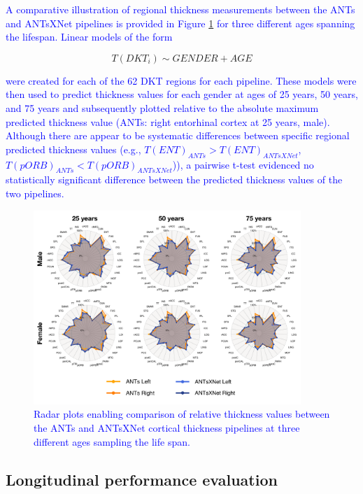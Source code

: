 \documentclass[12pt,]{article}
\begin{document}
\textcolor{blue}{
A comparative illustration of regional thickness measurements between the ANTs
and ANTsXNet pipelines is provided in Figure \ref{fig:radar} for three different
ages spanning the lifespan.  Linear models of the form}

\begin{equation}
  T(DKT_i) \sim GENDER + AGE
\end{equation}

\textcolor{blue}{
were created for each of the 62 DKT regions for each pipeline.  These models were
then used to predict thickness values for each gender at ages of 25 years, 50 years,
and 75 years and subsequently plotted relative to the absolute maximum predicted
thickness value (ANTs:  right entorhinal cortex at 25 years, male).  Although
there are appear to be systematic differences between specific regional predicted
thickness values (e.g., $T(ENT)_{ANTs} > T(ENT)_{ANTsXNet}$,
$T(pORB)_{ANTs} < T(pORB)_{ANTsXNet}$)), a pairwise t-test evidenced no statistically
significant difference between the predicted thickness values of the two pipelines.}

\begin{figure}[htb]
  \centering
    \includegraphics[width=0.9\textwidth]{Figures/radarSPRB.pdf}
  \caption{\textcolor{blue}{Radar plots enabling comparison of relative thickness values between
  the ANTs and ANTsXNet cortical thickness pipelines at three different ages
  sampling the life span.}}
  \label{fig:radar}
\end{figure}

\hypertarget{longitudinal-performance-evaluation}{%
\subsection*{Longitudinal performance
evaluation}\label{longitudinal-performance-evaluation}}
\end{document}
